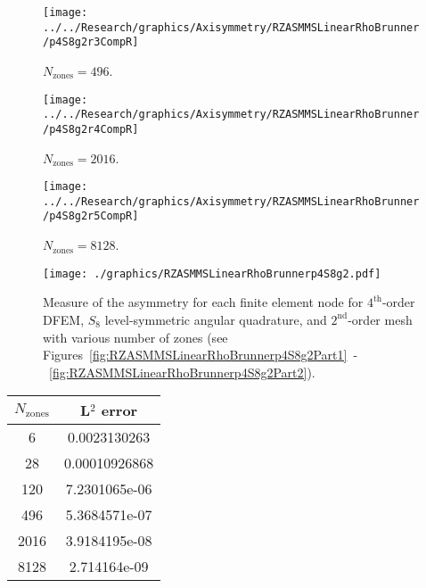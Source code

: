 \documentclass[12pt]{article}
\begin{document}
\begin{sidewaysfigure}[!htb]
\centering
\begin{subfigure}{0.33\textwidth}
\texttt{[image: ../../Research/graphics/Axisymmetry/RZASMMSLinearRhoBrunner/p4S8g2r3CompR]}
\caption{$N_\text{zones}=496$.}
\end{subfigure}%
\begin{subfigure}{0.33\textwidth}
\texttt{[image: ../../Research/graphics/Axisymmetry/RZASMMSLinearRhoBrunner/p4S8g2r4CompR]}
\caption{$N_\text{zones}=2016$.}
\end{subfigure}%
\begin{subfigure}{0.33\textwidth}
\texttt{[image: ../../Research/graphics/Axisymmetry/RZASMMSLinearRhoBrunner/p4S8g2r5CompR]}
\caption{$N_\text{zones}=8128$.}
\end{subfigure}
\caption{Relative asymmetry for $p=4$ finite elements on a $2^\text{nd}$-order mesh for $S_8$ level-symmetric angular quadrature; mesh overlay may be removed for clarity.}
\label{fig:RZASMMSLinearRhoBrunnerp4S8g2Part2}
\end{sidewaysfigure}

\begin{figure}[!htb]
\centering
\texttt{[image: ./graphics/RZASMMSLinearRhoBrunnerp4S8g2.pdf]}
\caption{Measure of the asymmetry for each finite element node for $4^\text{th}$-order DFEM, $S_8$ level-symmetric angular quadrature, and $2^\text{nd}$-order mesh with various number of zones (see Figures~\ref{fig:RZASMMSLinearRhoBrunnerp4S8g2Part1}~-~\ref{fig:RZASMMSLinearRhoBrunnerp4S8g2Part2}).}
\label{fig:RZASMMSLinearRhoBrunnerp4S8g2Nodes}
\end{figure}

\begin{table}[!htb]
\centering
{\renewcommand{\arraystretch}{1.5}
\begin{tabular}{|c|c|}
\hline
$N_\text{zones}$ & L$^2$ error \\\hline
6 & 0.0023130263 \\\hline
28 & 0.00010926868 \\\hline
120 & 7.2301065e-06 \\\hline
496 & 5.3684571e-07 \\\hline
2016 & 3.9184195e-08 \\\hline
8128 & 2.714164e-09 \\\hline
\end{tabular}}
\end{table}
\end{document}
